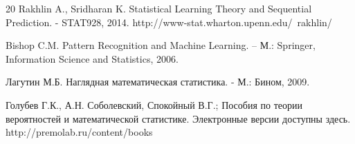 \begin{thebibliography} {20}
Rakhlin A., Sridharan K. Statistical Learning Theory and Sequential Prediction. - STAT928, 2014.
{\small http://www-stat.wharton.upenn.edu/~rakhlin/}

Bishop C.M. Pattern Recognition and Machine Learning. – М.: Springer,  Information Science and Statistics,  2006.


Лагутин М.Б. Наглядная математическая статистика. - М.: Бином, 2009.

\label{spok}
Голубев Г.К., А.Н. Соболевский, Спокойный В.Г.;  Пособия по теории вероятностей и математической статистике. 
Электронные версии доступны здесь.
http://premolab.ru/content/books



\end{thebibliography}


